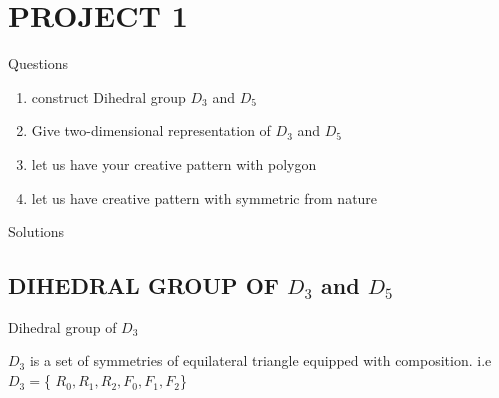 \documentclass{article}
\begin{document}
\newcommand{\drawTriangle}[3]{
\begin{tikzpicture}
    \drawGraph{3}
    \node[regular polygon,
    draw,minimum size=2cm,
    right color=white,left color=white,
    regular polygon sides = 3] (p) at (0,0.5){};
   \labelForthree{#1}{#2}{#3}
\end{tikzpicture}
}

\newcommand{\drawTrianglel}[7]{
\begin{tikzpicture}
    \drawGraph{3}
    \node[regular polygon,
    draw,minimum size=2cm,
    right color=white,left color=white,
    regular polygon sides = 3] (p) at (0,0.5){};
    \draw [dashed,color=black](#4,#5) -- (#6,#7);
   \labelForthree{#1}{#2}{#3}
\end{tikzpicture}
}

\section{\Large{PROJECT 1}}

\Large{Questions}
\begin{enumerate}
    \item construct Dihedral group $D_3$ and $D_5$
    \item Give two-dimensional representation of $D_3$ and $D_5$
    \item let us have your creative pattern with polygon
    \item let us have  creative pattern with symmetric from nature
\end{enumerate}

Solutions
\subsection{DIHEDRAL GROUP OF $D_3$ and $D_5$}
\Large{Dihedral group of  $D_3$}

$D_3$ is a set of symmetries of equilateral triangle  equipped with composition.
i.e $D_3=$\{ $R_0,R_1,R_2,F_0,F_1,F_2$\}
\end{document}
